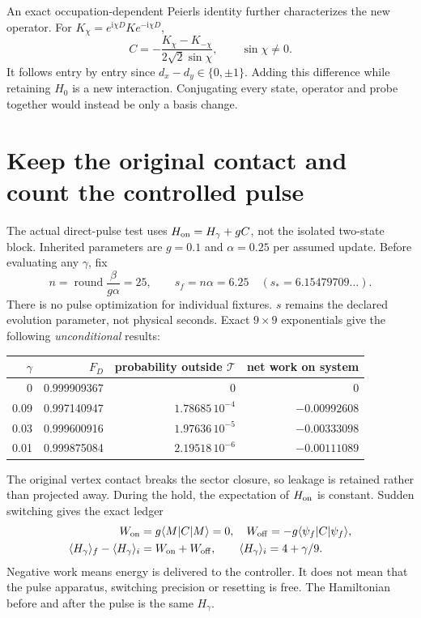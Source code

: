 \documentclass[11pt,a4paper]{article}
\newcommand{\ii}{\mathrm i}
\newcommand{\ket}[1]{|#1\rangle}
\newcommand{\bra}[1]{\langle#1|}
\begin{document}
An exact occupation-dependent Peierls identity further characterizes
the new operator. For $K_\chi=e^{\ii\chi D}K e^{-\ii\chi D}$,
\begin{equation}
 C=-\frac{K_\chi-K_{-\chi}}{2\sqrt2\sin\chi},\qquad\sin\chi\ne0.\label{peierls}
\end{equation}
It follows entry by entry since $d_x-d_y\in\{0,\pm1\}$. Adding this
difference while retaining $H_0$ is a new interaction. Conjugating every
state, operator and probe together would instead be only a basis change.

\newpage
\section{Keep the original contact and count the controlled pulse}
The actual direct-pulse test uses $H_{\rm on}=H_\gamma+gC$, not the
isolated two-state block. Inherited parameters are $g=0.1$ and
$\alpha=0.25$ per assumed update. Before evaluating any $\gamma$, fix
\begin{equation}
 n=\operatorname{round}\frac{\beta}{g\alpha}=25,\qquad
 s_f=n\alpha=6.25\quad(s_*=6.15479709\ldots).
\end{equation}
There is no pulse optimization for individual fixtures. $s$ remains
the declared evolution parameter, not physical seconds. Exact $9\times9$
exponentials give the following \emph{unconditional} results:
\begin{center}
\begin{tabular}{rrrr}\toprule
$\gamma$ & $F_D$ & probability outside $\mathcal T$ & net work on system\\\midrule
0 & 0.999909367 & 0 & 0\\
0.09 & 0.997140947 & $1.78685\,10^{-4}$ & $-0.00992608$\\
0.03 & 0.999600916 & $1.97636\,10^{-5}$ & $-0.00333098$\\
0.01 & 0.999875084 & $2.19518\,10^{-6}$ & $-0.00111089$\\\bottomrule
\end{tabular}
\end{center}
The original vertex contact breaks the sector closure, so leakage is
retained rather than projected away. During the hold, the expectation
of $H_{\rm on}$ is constant. Sudden switching gives the exact ledger
\begin{align}
 W_{\rm on}&=g\bra M C\ket M=0,\quad
 W_{\rm off}=-g\bra{\psi_f}C\ket{\psi_f},\\
 \langle H_\gamma\rangle_f-\langle H_\gamma\rangle_i
 &=W_{\rm on}+W_{\rm off},\qquad
 \langle H_\gamma\rangle_i=4+\gamma/9.\label{work-direct}
\end{align}
Negative work means energy is delivered to the controller. It does not
mean that the pulse apparatus, switching precision or resetting is free.
The Hamiltonian before and after the pulse is the same $H_\gamma$.
\end{document}
